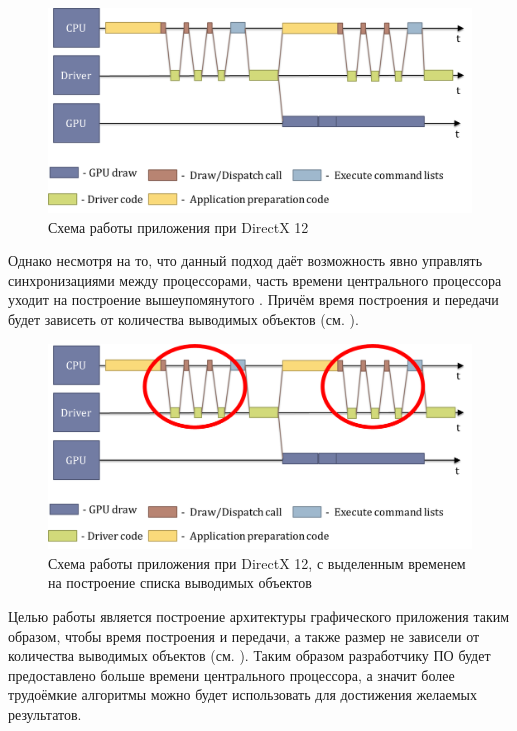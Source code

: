 \begin{figure}[ht!] 
	\center
	\includegraphics [scale=0.23] {my_folder/images//pipeline_dx12}
	\caption{Схема работы приложения при DirectX 12} 
	\label{fig:pipeline_dx12}  
\end{figure}

Однако несмотря на то, что данный подход даёт возможность явно управлять синхронизациями между процессорами, часть времени центрального процессора уходит на построение вышеупомянутого . Причём время построения и передачи будет зависеть от количества выводимых объектов (см. ).

\begin{figure}[ht!] 
	\center
	\includegraphics [scale=0.23] {my_folder/images//pipeline_dx12_circles}
	\caption{Схема работы приложения при DirectX 12, с выделенным временем на построение списка выводимых объектов} 
	\label{fig:pipeline_dx12_circles}  
\end{figure}

Целью работы является построение архитектуры графического приложения таким образом, чтобы время построения и передачи, а также размер  не зависели от количества выводимых объектов (см. ). Таким образом разработчику ПО будет предоставлено больше времени центрального процессора, а значит более трудоёмкие алгоритмы можно будет использовать для достижения желаемых результатов.

